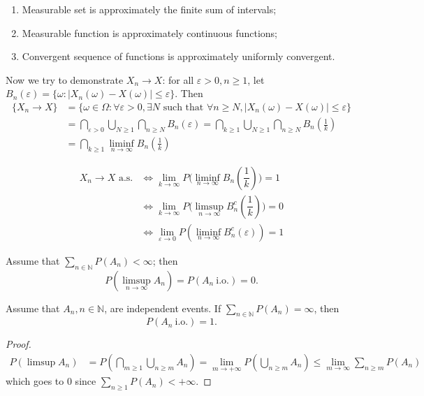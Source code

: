 \documentclass[11pt,singlecolumn, openany, citestyle=authoryear]{elegantbook}
\begin{document}
\begin{CJK}{UTF8}{gbsn}
\begin{theorem}
    \begin{enumerate}
        \item Measurable set is approximately the finite sum of intervals;
        \item Measurable function is approximately continuous functions;
        \item Convergent sequence of functions is approximately uniformly convergent.
    \end{enumerate}
\end{theorem}
Now we try to demonstrate $X_n \to X$:
for all $\varepsilon>0, n\geqslant 1$, let $B_n(\varepsilon)=\{\omega:|X_n(\omega)-X(\omega)|
\leqslant \varepsilon\}$. Then 
\allowdisplaybreaks[4]
\begin{align*}
    \{X_n\to X\}&=\{\omega\in\Omega:\forall \varepsilon>0, \exists N \text{ such that }
    \forall n\geqslant N, |X_n(\omega)-X(\omega)|\leqslant \varepsilon\}\\
    &= \bigcap_{\varepsilon>0}\bigcup_{N\geqslant 1}\bigcap_{n\geqslant N}B_n(\varepsilon)
    = \bigcap_{k\geqslant 1}\bigcup_{N\geqslant 1}\bigcap_{n\geqslant N}B_n\left(\frac{1}{k}\right)\\
    &= \bigcap_{k\geqslant 1}\liminf_{n\to\infty} B_n\left(\frac{1}{k}\right)
\end{align*}
\begin{lemma}
    \begin{align*}
    X_n\to X \text{ a.s.} &\iff \lim_{k\to\infty} P\bigg(\liminf_{n\to\infty}B_n
    \left(\dfrac{1}{k}\right)\bigg)=1\\
    &\iff \lim_{k\to\infty} P\bigg(\limsup_{n\to\infty}B_n^c
    \left(\dfrac{1}{k}\right)\bigg)=0\\
    &\iff \lim_{\varepsilon \to 0} P(\liminf_{n\to\infty}B_n^c(\varepsilon))=1
    \end{align*}
\end{lemma}
\begin{lemma}
    Assume that $\displaystyle \sum_{n\in \mathbb{N}} P(A_n) < \infty$; then
    $$
    P(\limsup_{n \to \infty}A_n) = P(A_n \ \text{i.o.}) = 0.
    $$

    Assume that $A_n, n \in \mathbb{N}$, are independent
    events. If $\displaystyle \sum_{n \in \mathbb{N}} P(A_n) = \infty$, then
    $$
    P(A_n \ \text{i.o.}) = 1.
    $$
\end{lemma}
\begin{proof}
    \begin{align*}
        P(\limsup A_n)&= P(\bigcap_{m\geqslant 1}\bigcup_{n\geqslant m}A_n) = 
        \lim_{m\to+\infty}P(\bigcup_{n\geqslant m}A_n)\leqslant \lim_{m\to\infty} 
        \sum_{n\geqslant m}P(A_n)
    \end{align*}
    which goes to $0$ since $\displaystyle \sum_{n\geqslant 1}P(A_n)<+\infty$.


\end{proof}
\end{CJK}
\end{document}
